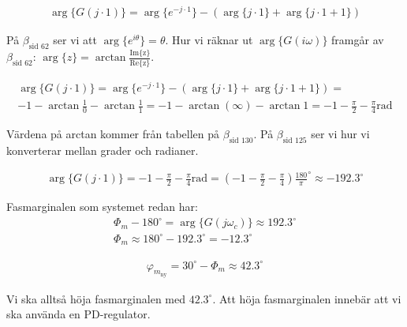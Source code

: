 \documentclass[a4paper]{article}
\newcommand{\mhb}[1]{$\beta_{\text{#1}}$}     %
\begin{document}
\begin{align*}
  \arg\{G(j\cdot 1)\} = \arg\{e^{-j\cdot 1}\} - (\arg\{j\cdot 1\} + \arg\{j\cdot 1 + 1\})
\end{align*}

På \mhb{sid 62} ser vi att $\arg\{e^{i\theta}\} = \theta$. Hur vi räknar ut $\arg\{ G(i\omega) \}$ framgår av \mhb{sid 62}: $\arg\{z\} = \arctan{\frac{\text{Im\{z\}}}{\text{Re\{z\}}}}$.

\begin{align*}
  \arg\{G(j\cdot 1)\} = \arg\{e^{-j\cdot 1}\} - (\arg\{j\cdot 1\} + \arg\{j\cdot 1 + 1\}) = \\
  -1 - \arctan\frac{1}{0} - \arctan\frac{1}{1} = -1 -\arctan ( \infty ) - \arctan 1 = -1 -\frac{\pi}{2} -\frac{\pi}{4} \text{rad}
\end{align*}

Värdena på arctan kommer från tabellen på \mhb{sid 130}. På \mhb{sid 125} ser vi hur vi konverterar mellan grader och radianer.

\begin{align*}
  \arg\{G(j\cdot 1)\} = -1 -\frac{\pi}{2} -\frac{\pi}{4} \text{rad} = (-1 -\frac{\pi}{2} -\frac{\pi}{4})\frac{180}{\pi}^\circ \approx -192.3^\circ
\end{align*}

Fasmarginalen som systemet redan har:
\begin{align*}
  \Phi_m - 180^\circ = \arg\{G(j\omega_c)\} \approx 192.3^\circ\\
  \Phi_m \approx 180^\circ - 192.3^\circ = -12.3^\circ
\end{align*}

\begin{align*}
  \varphi_{m_{\text{ny}}} = 30^\circ - \Phi_m \approx 42.3^\circ
\end{align*}

Vi ska alltså höja fasmarginalen med $42.3^\circ$. Att höja fasmarginalen innebär att vi ska använda en PD-regulator.
\end{document}
